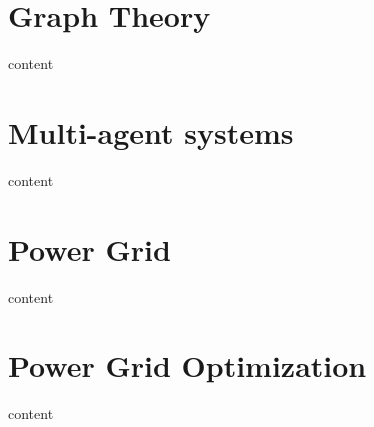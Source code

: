 \chapter{Graph Theory}
%
{content}

\chapter{Multi-agent systems}
%
{content}
\chapter{Power Grid}

{content}
\chapter{Power Grid Optimization}

{content}
